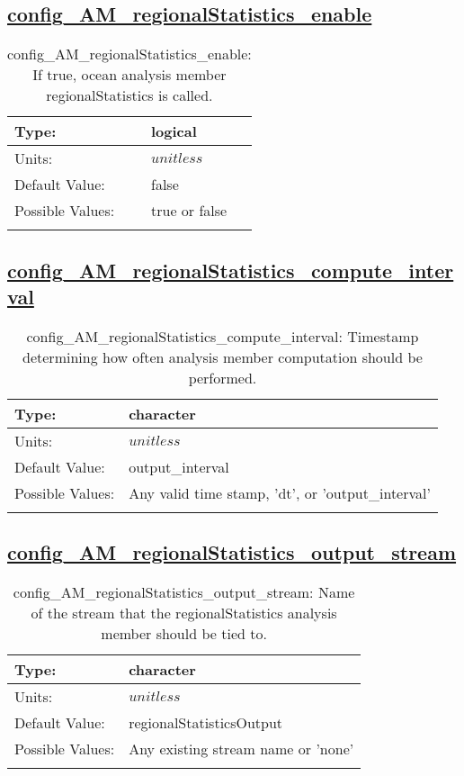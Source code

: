 \subsection[config\_AM\_regionalStatistics\_enable]{\hyperref[sec:nm_tab_AM_regionalStatistics]{config\_AM\_regionalStatistics\_enable}}
\label{subsec:nm_sec_config_AM_regionalStatistics_enable}
\begin{center}
\begin{longtable}{| p{2.0in} || p{4.0in} |}
    \hline
    Type: & logical \\
    \hline
    Units: & $unitless$ \\
    \hline
    Default Value: & false \\
    \hline
    Possible Values: & true or false \\
    \hline
    \caption{config\_AM\_regionalStatistics\_enable: If true, ocean analysis member regionalStatistics is called.}
\end{longtable}
\end{center}
\subsection[config\_AM\_regionalStatistics\_compute\_interval]{\hyperref[sec:nm_tab_AM_regionalStatistics]{config\_AM\_regionalStatistics\_compute\_interval}}
\label{subsec:nm_sec_config_AM_regionalStatistics_compute_interval}
\begin{center}
\begin{longtable}{| p{2.0in} || p{4.0in} |}
    \hline
    Type: & character \\
    \hline
    Units: & $unitless$ \\
    \hline
    Default Value: & output\_interval \\
    \hline
    Possible Values: & Any valid time stamp, 'dt', or 'output\_interval' \\
    \hline
    \caption{config\_AM\_regionalStatistics\_compute\_interval: Timestamp determining how often analysis member computation should be performed.}
\end{longtable}
\end{center}
\subsection[config\_AM\_regionalStatistics\_output\_stream]{\hyperref[sec:nm_tab_AM_regionalStatistics]{config\_AM\_regionalStatistics\_output\_stream}}
\label{subsec:nm_sec_config_AM_regionalStatistics_output_stream}
\begin{center}
\begin{longtable}{| p{2.0in} || p{4.0in} |}
    \hline
    Type: & character \\
    \hline
    Units: & $unitless$ \\
    \hline
    Default Value: & regionalStatisticsOutput \\
    \hline
    Possible Values: & Any existing stream name or 'none' \\
    \hline
    \caption{config\_AM\_regionalStatistics\_output\_stream: Name of the stream that the regionalStatistics analysis member should be tied to.}
\end{longtable}
\end{center}
